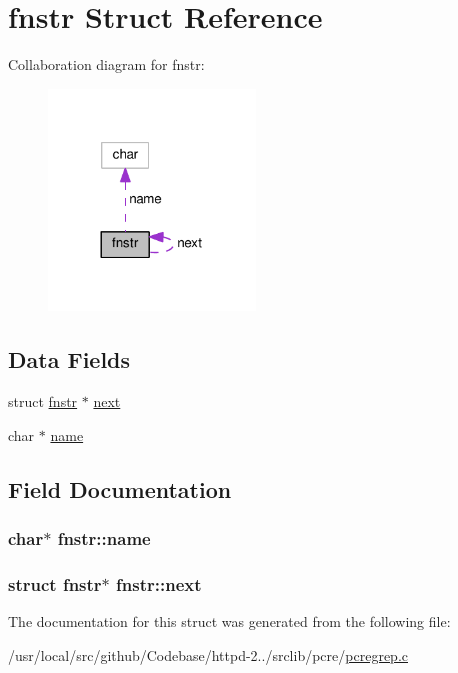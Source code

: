 \hypertarget{structfnstr}{}\section{fnstr Struct Reference}
\label{structfnstr}


Collaboration diagram for fnstr\+:
\nopagebreak
\begin{figure}[H]
\begin{center}
\leavevmode
\includegraphics[width=156pt]{structfnstr__coll__graph}
\end{center}
\end{figure}
\subsection*{Data Fields}
\begin{DoxyCompactItemize}
\item 
struct \hyperlink{structfnstr}{fnstr} $\ast$ \hyperlink{structfnstr_a041aa8a4f0dd8f1aae555ff6dcf50991}{next}
\item 
char $\ast$ \hyperlink{structfnstr_a7240c40df67d5dac282ff0aba63bca67}{name}
\end{DoxyCompactItemize}


\subsection{Field Documentation}
\subsubsection[{\texorpdfstring{name}{name}}]{\setlength{\rightskip}{0pt plus 5cm}char$\ast$ fnstr\+::name}\hypertarget{structfnstr_a7240c40df67d5dac282ff0aba63bca67}{}\label{structfnstr_a7240c40df67d5dac282ff0aba63bca67}
\subsubsection[{\texorpdfstring{next}{next}}]{\setlength{\rightskip}{0pt plus 5cm}struct {\bf fnstr}$\ast$ fnstr\+::next}\hypertarget{structfnstr_a041aa8a4f0dd8f1aae555ff6dcf50991}{}\label{structfnstr_a041aa8a4f0dd8f1aae555ff6dcf50991}


The documentation for this struct was generated from the following file\+:\begin{DoxyCompactItemize}
\item 
/usr/local/src/github/\+Codebase/httpd-\/2../srclib/pcre/\hyperlink{pcregrep_8c}{pcregrep.\+c}\end{DoxyCompactItemize}
